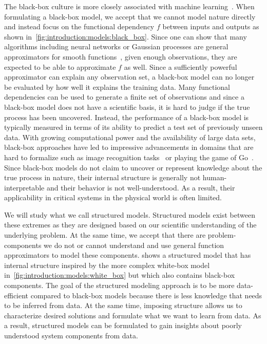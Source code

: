 The black-box culture is more closely associated with machine learning~\parencite{mitchell_machine_1997,goodfellow_deep_2016}.
When formulating a black-box model, we accept that we cannot model nature directly and instead focus on the functional dependency $f$ between inputs and outputs as shown in~\cref{fig:introduction:models:black_box}.
Since one can show that many algorithms including neural networks or Gaussian processes are general approximators for smooth functions~\parencite{rasmussen_gaussian_2006}, given enough observations, they are expected to be able to approximate $f$ as well.
Since a sufficiently powerful approximator can explain any observation set, a black-box model can no longer be evaluated by how well it explains the training data.
Many functional dependencies can be used to generate a finite set of observations and since a black-box model does not have a scientific basis, it is hard to judge if the true process has been uncovered.
Instead, the performance of a black-box model is typically measured in terms of its ability to predict a test set of previously unseen data.
With growing computational power and the availability of large data sets, black-box approaches have led to impressive advancements in domains that are hard to formalize such as image recognition tasks~\parencite{lecun_backpropagation_1989} or playing the game of Go~\parencite{silver_mastering_2016}.
Since black-box models do not claim to uncover or represent knowledge about the true process in nature, their internal structure is generally not human-interpretable and their behavior is not well-understood.
As a result, their applicability in critical systems in the physical world is often limited.

We will study what we call structured models.
Structured models exist between these extremes as they are designed based on our scientific understanding of the underlying problem.
At the same time, we accept that there are problem-components we do not or cannot understand and use general function approximators to model these components.
 shows a structured model that has internal structure inspired by the more complex white-box model in~\cref{fig:introduction:models:white_box} but which also contains black-box components.
The goal of the structured modeling approach is to be more data-efficient compared to black-box models because there is less knowledge that needs to be inferred from data.
At the same time, imposing structure allows us to characterize desired solutions and formulate what we want to learn from data.
As a result, structured models can be formulated to gain insights about poorly understood system components from data.

